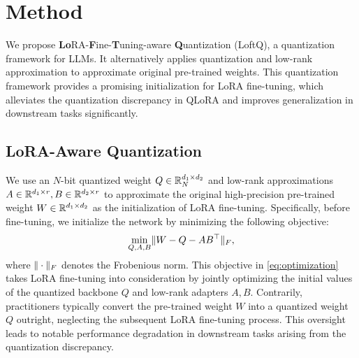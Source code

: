 \section{Method}\label{sec:method}
We propose \textbf{Lo}RA-\textbf{F}ine-\textbf{T}uning-aware \textbf{Q}uantization (LoftQ), a quantization framework for LLMs. It alternatively applies quantization and low-rank approximation to approximate original pre-trained weights. 
This quantization framework provides a promising initialization for LoRA fine-tuning, which alleviates the quantization discrepancy in QLoRA and improves generalization in downstream tasks significantly.

\subsection{LoRA-Aware Quantization}
We use an $N$-bit quantized weight $Q \in \mathbb{R}_{N}^{d_1 \times d_2}$ and low-rank approximations $A \in \mathbb{R}^{d_1 \times r}, B \in \mathbb{R}^{d_2 \times r}$ to approximate the original high-precision pre-trained weight $W \in \mathbb{R}^{d_1 \times d_2}$ as the initialization of LoRA fine-tuning.
Specifically, before fine-tuning, we initialize the network by minimizing the following objective:
\begin{align}
\label{eq:optimization}
   \underset{Q, A, B}{\min}  \|W - Q - AB^{\top}\|_{F},
\end{align}
where $\|\cdot\|_{F}$ denotes the Frobenious norm. This objective in \eqref{eq:optimization} takes LoRA fine-tuning into consideration by jointly optimizing the initial values of the quantized backbone $Q$ and low-rank adapters $A, B$.
Contrarily, practitioners typically convert the pre-trained weight $W$ into a quantized weight $Q$ outright, neglecting the subsequent LoRA fine-tuning process. This oversight leads to notable performance degradation in downstream tasks arising from the quantization discrepancy.

